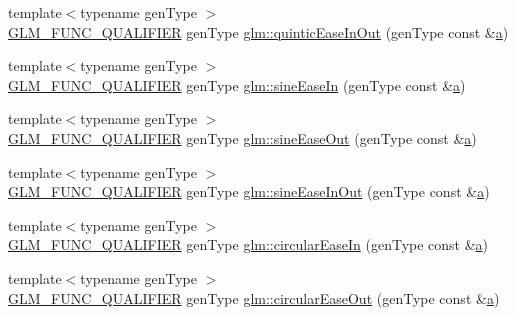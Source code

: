 \begin{DoxyCompactItemize}
\item 
{\footnotesize template$<$typename gen\+Type $>$ }\\\hyperlink{setup_8hpp_a33fdea6f91c5f834105f7415e2a64407}{G\+L\+M\+\_\+\+F\+U\+N\+C\+\_\+\+Q\+U\+A\+L\+I\+F\+I\+ER} gen\+Type \hyperlink{group__gtx__easing_ga2a82d5c46df7e2d21cc0108eb7b83934}{glm\+::quintic\+Ease\+In\+Out} (gen\+Type const \&\hyperlink{_s_d_l__opengl__glext_8h_a3309789fc188587d666cda5ece79cf82}{a})
\item 
{\footnotesize template$<$typename gen\+Type $>$ }\\\hyperlink{setup_8hpp_a33fdea6f91c5f834105f7415e2a64407}{G\+L\+M\+\_\+\+F\+U\+N\+C\+\_\+\+Q\+U\+A\+L\+I\+F\+I\+ER} gen\+Type \hyperlink{group__gtx__easing_gafb338ac6f6b2bcafee50e3dca5201dbf}{glm\+::sine\+Ease\+In} (gen\+Type const \&\hyperlink{_s_d_l__opengl__glext_8h_a3309789fc188587d666cda5ece79cf82}{a})
\item 
{\footnotesize template$<$typename gen\+Type $>$ }\\\hyperlink{setup_8hpp_a33fdea6f91c5f834105f7415e2a64407}{G\+L\+M\+\_\+\+F\+U\+N\+C\+\_\+\+Q\+U\+A\+L\+I\+F\+I\+ER} gen\+Type \hyperlink{group__gtx__easing_gab3e454f883afc1606ef91363881bf5a3}{glm\+::sine\+Ease\+Out} (gen\+Type const \&\hyperlink{_s_d_l__opengl__glext_8h_a3309789fc188587d666cda5ece79cf82}{a})
\item 
{\footnotesize template$<$typename gen\+Type $>$ }\\\hyperlink{setup_8hpp_a33fdea6f91c5f834105f7415e2a64407}{G\+L\+M\+\_\+\+F\+U\+N\+C\+\_\+\+Q\+U\+A\+L\+I\+F\+I\+ER} gen\+Type \hyperlink{group__gtx__easing_gaa46e3d5fbf7a15caa28eff9ef192d7c7}{glm\+::sine\+Ease\+In\+Out} (gen\+Type const \&\hyperlink{_s_d_l__opengl__glext_8h_a3309789fc188587d666cda5ece79cf82}{a})
\item 
{\footnotesize template$<$typename gen\+Type $>$ }\\\hyperlink{setup_8hpp_a33fdea6f91c5f834105f7415e2a64407}{G\+L\+M\+\_\+\+F\+U\+N\+C\+\_\+\+Q\+U\+A\+L\+I\+F\+I\+ER} gen\+Type \hyperlink{group__gtx__easing_ga34508d4b204a321ec26d6086aa047997}{glm\+::circular\+Ease\+In} (gen\+Type const \&\hyperlink{_s_d_l__opengl__glext_8h_a3309789fc188587d666cda5ece79cf82}{a})
\item 
{\footnotesize template$<$typename gen\+Type $>$ }\\\hyperlink{setup_8hpp_a33fdea6f91c5f834105f7415e2a64407}{G\+L\+M\+\_\+\+F\+U\+N\+C\+\_\+\+Q\+U\+A\+L\+I\+F\+I\+ER} gen\+Type \hyperlink{group__gtx__easing_ga26fefde9ced9b72745fe21f1a3fe8da7}{glm\+::circular\+Ease\+Out} (gen\+Type const \&\hyperlink{_s_d_l__opengl__glext_8h_a3309789fc188587d666cda5ece79cf82}{a})

\end{DoxyCompactItemize}
